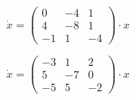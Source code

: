 \begin{multicols}{3}
\begin{enumtasks}
			\item \( \dot{x} = \begin{pmatrix} 0 & -4 & 1 \\ 4 & -8 & 1 \\ -1 & 1 & -4 \end{pmatrix} \cdot x \) %
			\item \( \dot{x} = \begin{pmatrix} -3 & 1 & 2 \\ 5 & -7 & 0 \\ -5 & 5 & -2 \end{pmatrix} \cdot x \) %

\end{enumtasks}
\end{multicols}
